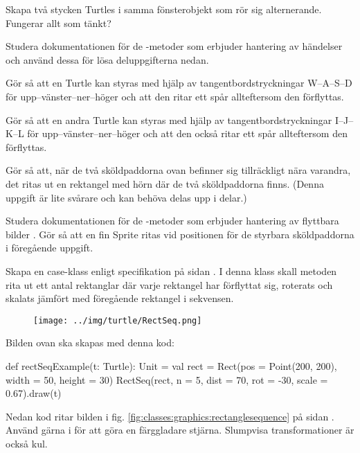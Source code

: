 \Task Skapa två stycken Turtles i samma fönsterobjekt som rör sig alternerande. Fungerar allt som tänkt?


\Task Studera dokumentationen för de -metoder som erbjuder hantering av händelser  och använd dessa för lösa deluppgifterna nedan.

\Subtask Gör så att en Turtle kan styras med hjälp av tangentbordstryckningar W--A--S--D för upp--vänster--ner--höger och att den ritar ett spår allteftersom den förflyttas.

\Subtask Gör så att en andra Turtle kan styras med hjälp av tangentbordstryckningar I--J--K--L för upp--vänster--ner--höger och att den också ritar ett spår allteftersom den förflyttas.

\Subtask Gör så att, när de två sköldpaddorna ovan befinner sig tillräckligt nära varandra, det ritas ut en rektangel med hörn där de två sköldpaddorna finns. (Denna uppgift är lite svårare och kan behöva delas upp i delar.)


\Task Studera dokumentationen för de -metoder som erbjuder hantering av flyttbara bilder . Gör så att en fin Sprite ritas vid positionen för de styrbara sköldpaddorna i föregående uppgift.


\Task Skapa en case-klass  enligt specifikation på sidan \pageref{code:classes:graphics:rectanglesequence}. I denna klass skall metoden  rita ut ett antal rektanglar där varje rektangel har förflyttat sig, roterats och skalats jämfört med föregående rektangel i sekvensen.

\begin{figure}[H]
\centering
\texttt{[image: ../img/turtle/RectSeq.png]}
\end{figure}
\noindent Bilden ovan ska skapas med denna kod:
\begin{Code}
  def rectSeqExample(t: Turtle): Unit  = {
    val rect = Rect(pos = Point(200, 200), width = 50, height = 30)
    RectSeq(rect, n = 5, dist = 70, rot = -30, scale = 0.67).draw(t)
  }
\end{Code}

\noindent Nedan kod ritar bilden i fig. \ref{fig:classes:graphics:rectanglesequence} på sidan \pageref{fig:classes:graphics:rectanglesequence}. Använd gärna  i  för att göra en färggladare stjärna. Slumpvisa transformationer är också kul.

